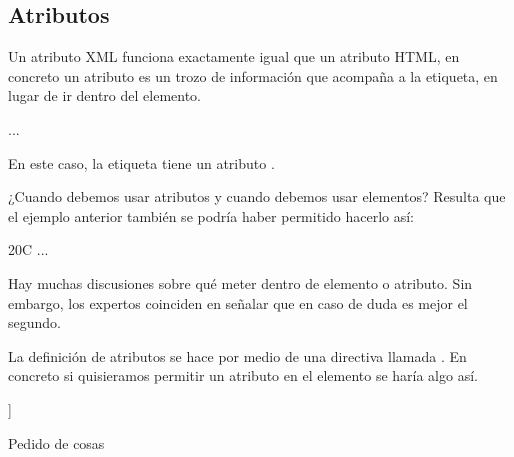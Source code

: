\documentclass[letterpaper,10pt,spanish]{sphinxmanual}
\begin{document}
\subsection{Atributos}
\label{\detokenize{tema5:atributos}}
Un atributo XML funciona exactamente igual que un atributo HTML, en concreto un atributo es un trozo de información que acompaña a la etiqueta, en lugar de ir dentro del elemento.

\begin{sphinxVerbatim}[commandchars=\\\{\}]
 
                ...
\end{sphinxVerbatim}

En este caso, la etiqueta  tiene un atributo .

¿Cuando debemos usar atributos y cuando debemos usar elementos? Resulta que el ejemplo anterior también se podría haber permitido hacerlo así:

\begin{sphinxVerbatim}[commandchars=\\\{\}]
        20C
                ...
\end{sphinxVerbatim}

Hay muchas discusiones sobre qué meter dentro de elemento o atributo. Sin embargo, los expertos coinciden en señalar que en caso de duda es mejor el segundo.

La definición de atributos se hace por medio de una directiva llamada . En concreto si quisieramos permitir un atributo  en el elemento  se haría algo así.

\begin{sphinxVerbatim}[commandchars=\\\{\}]
\PYG{c+cp}{\PYGZlt{}!DOCTYPE pedido[}
]\PYGZgt{}

 
        Pedido de cosas
\end{sphinxVerbatim}
\end{document}
